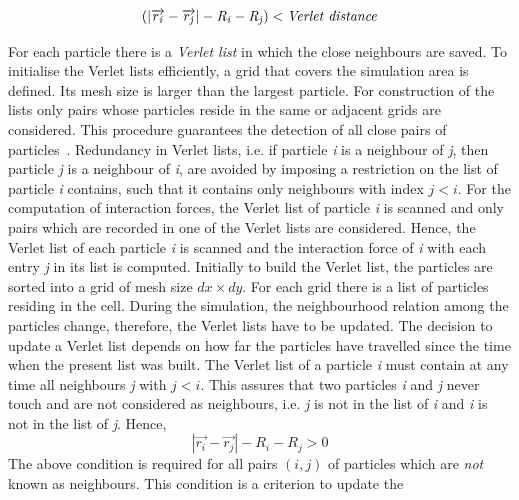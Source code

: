 \begin{equation}
(\left|\overrightarrow{r_{\mathit{i}}}-\overrightarrow{r_{\mathit{j}}}\right|-\mathit{R}_{\mathit{i}}-\mathit{R}_{\mathit{j}})<\mbox{\textit{Verlet
 distance}}
\end{equation}

For each particle there is a \textit{Verlet list} in which the close 
neighbours are saved. To 
initialise the Verlet lists efficiently, a grid that covers the simulation 
area is defined. Its 
mesh size is larger than the largest particle. For construction of the lists 
only pairs whose 
particles reside in the same or adjacent grids are considered. This procedure 
guarantees the 
detection of all close pairs of particles~\citep{Posch2005}. Redundancy in 
Verlet lists, i.e. if 
particle \textit{i} is a neighbour of \textit{j}, then particle \textit{j} is 
a neighbour of 
\textit{i}, are avoided by imposing a restriction on the list of particle 
\textit{i} contains, 
such 
that it contains only neighbours with index $\mathit{j}<\mathit{i}$. For the 
computation of 
interaction forces, the Verlet list of particle \textit{i} is scanned and only 
pairs which are 
recorded in one of the Verlet lists are considered. Hence, the Verlet list of 
each particle 
\textit{i} is scanned and the interaction force of \textit{i} with each entry 
\textit{j} in its 
list is computed. Initially to build the Verlet list, the particles are sorted 
into a grid of mesh 
size $\mathit{dx}\times\mathit{dy}$. For each grid there is a list of 
particles residing in the 
cell. During the simulation, the neighbourhood relation among the particles 
change, therefore, the 
Verlet lists have to be updated. The decision to update a Verlet list depends 
on how far the 
particles have travelled since the time when the present list was built. The 
Verlet list of a 
particle \textit{i} must contain at any time all neighbours \textit{j} with 
$\mathit{j}<\mathit{i}$. This assures that two particles \textit{i} and 
\textit{j} never touch and 
are not considered as neighbours, i.e. \textit{j} is not in the list of 
\textit{i} and \textit{i} 
is not in the list of \textit{j}. Hence,
%
\begin{equation}
\left|\overrightarrow{r_{\mathit{i}}}-\overrightarrow{r_{\mathit{j}}}\right|-\mathit{R}_{\mathit{i}}-\mathit{R}_{\mathit{j}}>0
\end{equation}
%
The above condition is required for all pairs $(\mathit{i},\mathit{j})$ of 
particles which are 
\textit{not} known as neighbours. This condition is a criterion to update the 
